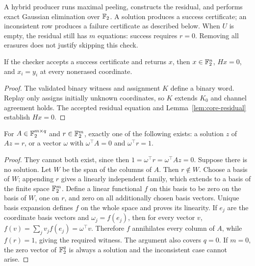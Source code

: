 A hybrid producer runs maximal peeling, constructs the residual, and
performs exact Gaussian elimination over $\mathbb{F}_2$. A solution produces
a success certificate; an inconsistent row produces a failure
certificate as described below. When $U$ is empty, the residual still
has $m$ equations: success requires $r=0$. Removing all erasures does
not justify skipping this check.

\begin{thm}\label{thm:core-success}
If the checker accepts a success certificate and returns $x$, then
$x\in\mathbb{F}_2^n$, $Hx=0$, and $x_i=y_i$ at every nonerased coordinate.
\end{thm}
\begin{proof}
The validated binary witness and assignment $K$ define a binary word.
Replay only assigns initially unknown coordinates, so $K$ extends
$K_0$ and channel agreement holds. The accepted residual equation and
Lemma~\ref{lem:core-residual} establish $Hx=0$.
\end{proof}

\begin{lem}\label{lem:core-alternative}
For $A\in\mathbb{F}_2^{m\times q}$ and $r\in\mathbb{F}_2^m$, exactly one of the
following exists: a solution $z$ of $Az=r$, or a vector $\omega$ with
$\omega^\top A=0$ and $\omega^\top r=1$.
\end{lem}
\begin{proof}
They cannot both exist, since then
$1=\omega^\top r=\omega^\top Az=0$.
Suppose there is no solution. Let $W$ be the span of the columns of
$A$. Then $r\notin W$. Choose a basis of $W$; appending $r$ gives a
linearly independent family, which extends to a basis of the finite
space $\mathbb{F}_2^m$. Define a linear functional $f$ on this basis to be
zero on the basis of $W$, one on $r$, and zero on all additionally
chosen basis vectors. Unique basis expansion defines $f$ on the
whole space and proves its linearity. If $e_j$ are the coordinate
basis vectors and $\omega_j=f(e_j)$, then for every vector $v$,
$f(v)=\sum_j v_j f(e_j)=\omega^\top v$. Therefore $f$ annihilates
every column of $A$, while $f(r)=1$, giving the required witness.
The argument also covers $q=0$. If $m=0$, the zero vector of $\mathbb{F}_2^q$ is always
a solution and the inconsistent case cannot arise.
\end{proof}

